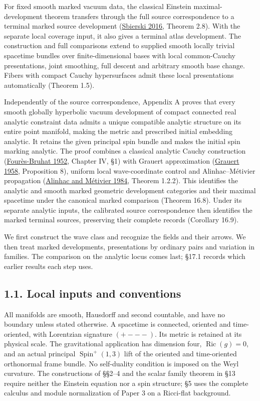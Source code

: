\documentclass[
  english,
  11pt,
  reqno]{amsart}
\begin{document}
For fixed smooth marked vacuum data, the classical Einstein
maximal-development theorem transfers through the full source
correspondence to a terminal marked source development
(\hyperref[ref-Sbierski2016]{Sbierski 2016}, Theorem 2.8). With the
separate local coverage input, it also gives a terminal atlas
development. The construction and full comparisons extend to supplied
smooth locally trivial spacetime bundles over finite-dimensional bases
with local common-Cauchy presentations, joint smoothing, full descent
and arbitrary smooth base change. Fibers with compact Cauchy
hypersurfaces admit these local presentations automatically (Theorem
1.5).

Independently of the source correspondence, Appendix A proves that every
smooth globally hyperbolic vacuum development of compact connected real
analytic constraint data admits a unique compatible analytic structure
on its entire point manifold, making the metric and prescribed initial
embedding analytic. It retains the given principal spin bundle and makes
the initial spin marking analytic. The proof combines a classical
analytic Cauchy construction
(\hyperref[ref-FouresBruhat1952]{Fourès-Bruhat 1952}, Chapter IV, §1)
with Grauert approximation (\hyperref[ref-Grauert1958]{Grauert 1958},
Proposition 8), uniform local wave-coordinate control and
Alinhac--Métivier propagation
(\hyperref[ref-AlinhacMetivier1984]{Alinhac and Métivier 1984}, Theorem
1.2.2). This identifies the analytic and smooth marked geometric
development categories and their maximal spacetime under the canonical
marked comparison (Theorem 16.8). Under its separate analytic inputs,
the calibrated source correspondence then identifies the marked terminal
sources, preserving their complete records (Corollary 16.9).

We first construct the wave class and recognize the fields and their
arrows. We then treat marked developments, presentations by ordinary
pairs and variation in families. The comparison on the analytic locus
comes last; §17.1 records which earlier results each step uses.

\protect{}\label{sec:local-inputs-and-conventions}

\subsection{1.1. Local inputs and
conventions}\label{local-inputs-and-conventions}

All manifolds are smooth, Hausdorff and second countable, and have no
boundary unless stated otherwise. A spacetime is connected, oriented and
time-oriented, with Lorentzian signature \((+---)\). Its metric is
retained at its physical scale. The gravitational application has
dimension four, \(\operatorname{Ric}(g)=0\), and an actual principal
\(\operatorname{Spin}^+(1,3)\) lift of the oriented and time-oriented
orthonormal frame bundle. No self-duality condition is imposed on the
Weyl curvature. The constructions of §§2--4 and the scalar family
theorem in §13 require neither the Einstein equation nor a spin
structure; §5 uses the complete calculus and module normalization of
Paper 3 on a Ricci-flat background.
\end{document}
